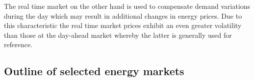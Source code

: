 The real time market on the other hand is used to compensate demand variations during the day which may result in additional changes in energy prices. 
Due to this characteristic the real time market prices exhibit an even greater volatility than those at the day-ahead market whereby the latter is generally used for reference. 




%





\subsection{Outline of selected energy markets}



